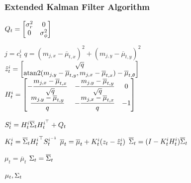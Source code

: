    \begin{frame}
   \frametitle{Extended Kalman Filter Algorithm}
   \footnotesize
   \begin{algorithmic}[1]
   \State
   $ Q_{t} =
   \begin{bmatrix}
   \sigma_{r}^{2} & 0\\
   0 & \sigma_{\phi}^{2}
    \end{bmatrix}
    $
   
    \State $ j = c_{t}^{i}$
    \State $ q = (m_{j,x}-\overline{\mu}_{t,x})^{2} + (m_{j,y}-\overline{\mu}_{t,y})^{2} $
    \State
    $ \hat{z}_{t}^{i} =
    \begin{bmatrix}
    \sqrt{q}\\
    \operatorname{atan2}(m_{j,y}-\overline{\mu}_{t,y}, m_{j,x}-\overline{\mu}_{t,x}) - \overline{\mu}_{t,\theta}
    \end{bmatrix}
    $
    \State
    $ H_{t}^{i} =
    \begin{bmatrix}
    -\dfrac{m_{j,x} - \overline{\mu}_{t,x}}{\sqrt{q}} & -\dfrac{m_{j,y} - \overline{\mu}_{t,y}}{\sqrt{q}} & 0\\
    \dfrac{m_{j,y} - \overline{\mu}_{t,y}}{q} & -\dfrac{m_{j,x} - \overline{\mu}_{t,x}}{q} & -1
    \end{bmatrix}
    $
   
    \State $S_{t}^{i} = H_{t}^{i} \overline{\Sigma}_{t} H_{t}^{i^{\top}} + Q_{t} $
   
    \State $K_{t}^{i} = \overline{\Sigma}_{t} {H_{t}^{i}}^{\top} S_{t}^{i^{-1}} $
    \State $\overline{\mu}_{t} = \overline{\mu}_{t} + K_{t}^{i}(z_{t} - \hat{z}_{t}^{i})$
    \State $\overline{\Sigma}_{t} = (I - K_{t}^{i}H_{t}^{i})\overline{\Sigma}_{t}$
   
    \EndFor
    \State $\mu_{t} = \overline{\mu}_{t}$
    \State $\Sigma_{t} = \overline{\Sigma}_{t}$
   
    \State \Return $\mu_{t}, \Sigma_{t}$
    \end{algorithmic}
   
   
\end{frame}

